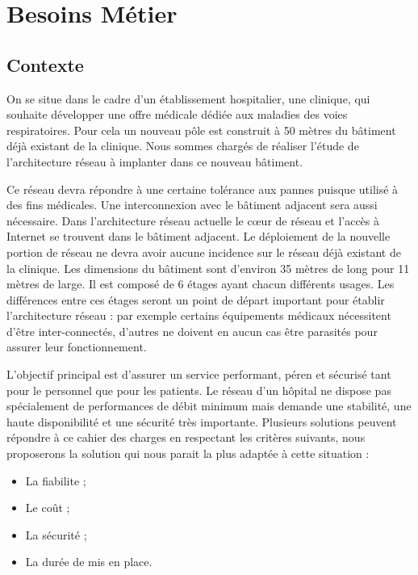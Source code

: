 \section{Besoins Métier}

%
%
\subsection{Contexte}

On se situe dans le cadre d'un établissement hospitalier, une clinique, qui souhaite développer une offre médicale dédiée aux maladies des voies respiratoires.
Pour cela un nouveau pôle est construit à 50 mètres du bâtiment déjà existant de la clinique.
Nous sommes chargés de réaliser l'étude de l'architecture réseau à implanter dans ce nouveau bâtiment.

%

Ce réseau devra répondre à une certaine tolérance aux pannes puisque utilisé à des fins médicales.
Une interconnexion avec le bâtiment adjacent sera aussi nécessaire.
Dans l'architecture réseau actuelle le cœur de réseau et l'accès à Internet se trouvent dans le bâtiment adjacent.
Le déploiement de la nouvelle portion de réseau ne devra avoir aucune incidence sur le réseau déjà existant de la clinique.
Les dimensions du bâtiment sont d'environ 35 mètres de long pour 11 mètres de large.
Il est composé de 6 étages ayant chacun différents usages.
Les différences entre ces étages seront un point de départ important pour établir l'architecture réseau : par exemple certains équipements médicaux nécessitent d'être inter-connectés, d'autres ne doivent en aucun cas être parasités pour assurer leur fonctionnement.

%

L'objectif principal est d'assurer un service performant, péren et sécurisé tant pour le personnel que pour les patients.
Le réseau d'un hôpital ne dispose pas spécialement de performances de débit minimum mais demande une stabilité, une haute disponibilité et une sécurité très importante.
Plusieurs solutions peuvent répondre à ce cahier des charges en respectant les critères suivants, nous proposerons la solution qui nous parait la plus adaptée à cette situation :
\begin{itemize}
\item La fiabilite ;
\item Le coût ;
\item La sécurité ;
\item La durée de mis en place.
\end{itemize}

